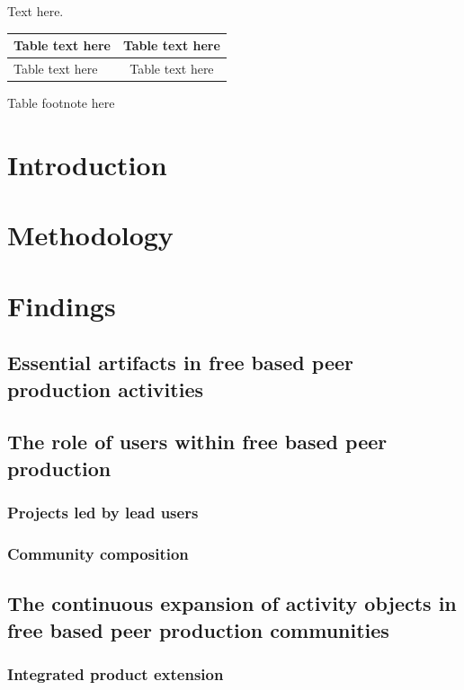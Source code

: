 \documentclass{ICED-Paper}%
\begin{document}
Text here.

\begin{table}
{\tabcolsep=2pc\begin{tabular}{|l|c|}%
\hline
Table text here & Table text here\\%
\hline
Table text here & Table text here\\%
\hline
\end{tabular}}{Table footnote here}
\end{table}

\section{Introduction}


\section{Methodology}

\section{Findings}
\subsection{Essential artifacts in free based peer production activities}

\subsection{The role of users within free based peer production}

\subsubsection{Projects led by lead users}

\subsubsection{Community composition}

\subsection{The continuous expansion of activity objects in free based peer production communities}

\subsubsection{Integrated product extension}
\end{document}
